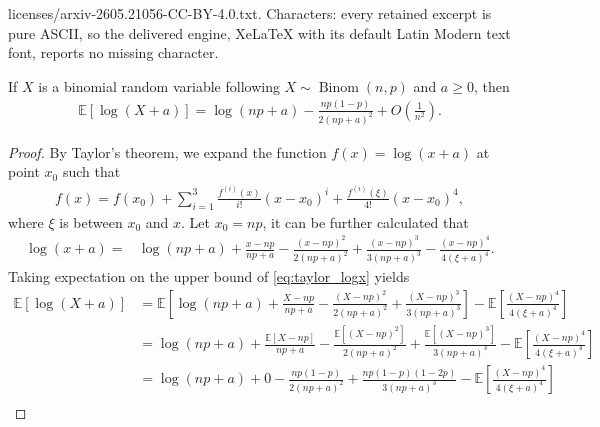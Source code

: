 \documentclass[10pt,a4paper]{amsart}
\DeclareMathOperator{\Binomial}{Binom}
\newcommand{\EE}{{\mathbb{E}}}
\begin{document}
licenses/arxiv-2605.21056-CC-BY-4.0.txt. Characters: every retained excerpt is pure ASCII, so the delivered engine, XeLaTeX with its default Latin Modern text font, reports no missing character.
	\begin{lemma} \label{lem:exp_bin_logx}
		If $X$ is a binomial random variable following $X \sim \Binomial(n, p)$ and $a \geq 0$, then
		\begin{equation}
			\begin{aligned}
				\EE \left[ \log (X + a) \right] = \log (np + a) - \frac{np (1 - p)}{2 (np + a)^2} + O\left( \frac{1}{n^2} \right).
			\end{aligned}
		\end{equation}
	\end{lemma}

	\begin{proof}
		By Taylor's theorem, we expand the function $f(x) = \log (x + a)$ at point $x_0$ such that
		\begin{equation}
			\begin{aligned}
				f(x) = f(x_0) + \sum_{i=1}^{3} \frac{f^{(i)}(x)}{i !} (x - x_0)^i + \frac{f^{(i)}(\xi)}{4 !} (x - x_0)^4,
			\end{aligned}
		\end{equation}
		where $\xi$ is between $x_0$ and $x$. Let $x_0 = np$, it can be further calculated that
		\begin{equation}
			\begin{aligned}
				\log (x + a) =& \log (np + a) + \frac{x - np}{np + a} - \frac{(x - np)^2}{2 (np + a)^2} + \frac{(x - np)^3}{3 (np + a)^3} - \frac{(x - np)^4}{4 (\xi + a)^4}.
			\end{aligned}
			\label{eq:taylor_logx}
		\end{equation}
		Taking expectation on the upper bound of \eqref{eq:taylor_logx} yields
		\begin{equation}
			\begin{aligned}
				\EE \left[ \log (X + a) \right] &= \EE \left[ \log (np + a) + \frac{X - np}{np + a} - \frac{(X - np)^2}{2 (np + a)^2} + \frac{(X - np)^3}{3 (np + a)^3} \right] - \EE \left[ \frac{(X - np)^4}{4 (\xi + a)^4} \right] \\
				&= \log (np + a) + \frac{\EE \left[ X - np \right]}{np + a} - \frac{\EE \left[ (X - np)^2 \right]}{2 (np + a)^2} + \frac{\EE \left[ (X - np)^3 \right]}{3 (np + a)^3} - \EE \left[ \frac{(X - np)^4}{4 (\xi + a)^4} \right] \\
				&= \log (np + a) + 0 - \frac{np (1 - p)}{2 (np + a)^2} + \frac{np (1 - p) (1 - 2p)}{3 (np + a)^3} - \EE \left[ \frac{(X - np)^4}{4 (\xi + a)^4} \right] \\

\end{aligned}
\end{equation}
\end{proof}
\end{document}
